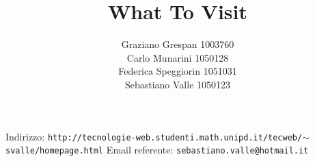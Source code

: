 \documentclass[
article,
10pt, %
oneside, %
BCOR5mm, %
]{scrartcl}
\begin{document}
\begin{center}
\title{What To Visit}
\author{Graziano Grespan 1003760 \\
Carlo Munarini 1050128 \\
Federica Speggiorin 1051031 \\
Sebastiano Valle 1050123}
\end{center} %









\maketitle %

\setcounter{page}{1} %

Indirizzo: \texttt{http://tecnologie-web.studenti.math.unipd.it/tecweb/$\sim$svalle/homepage.html}
Email referente: \texttt{sebastiano.valle@hotmail.it}
\newpage{}
\tableofcontents %



\listoffigures %

\listoftables %



















\newpage %
\end{document}
